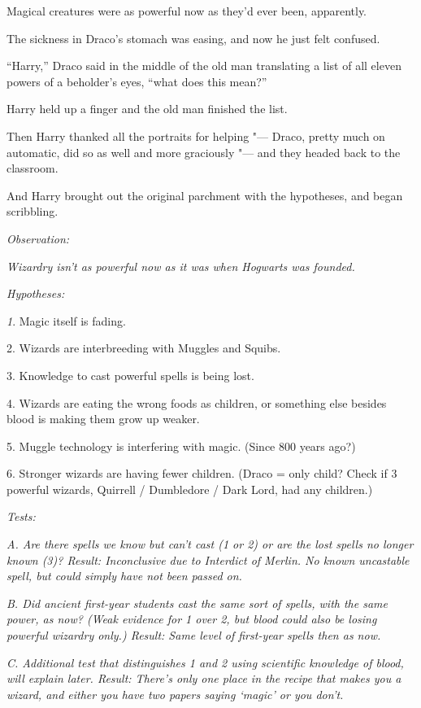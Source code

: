 Magical creatures were as powerful now as they'd ever been, apparently.

The sickness in Draco's stomach was easing, and now he just felt
confused.

``Harry,'' Draco said in the middle of the old man translating a list of
all eleven powers of a beholder's eyes, ``what does this mean?''

Harry held up a finger and the old man finished the list.

Then Harry thanked all the portraits for helping "--- Draco, pretty much on
automatic, did so as well and more graciously "--- and they headed back to
the classroom.

And Harry brought out the original parchment with the hypotheses, and
began scribbling.

\emph{Observation:}

\emph{Wizardry isn't as powerful now as it was when Hogwarts was
founded.}

\emph{Hypotheses:}

\emph{1}. Magic itself is fading.

2. Wizards are interbreeding with Muggles and Squibs.

3. Knowledge to cast powerful spells is being lost.

4. Wizards are eating the wrong foods as children, or something else
besides blood is making them grow up weaker.

5. Muggle technology is interfering with magic. (Since 800 years ago?)

6. Stronger wizards are having fewer children. (Draco = only child?
Check if 3 powerful wizards, Quirrell / Dumbledore / Dark Lord, had any
children.)

\emph{Tests:}

\emph{A. Are there spells we know but can't cast (1 or 2) or are the
lost spells no longer known (3)? Result: Inconclusive due to Interdict
of Merlin. No known uncastable spell, but could simply have not been
passed on.}

\emph{B. Did ancient first-year students cast the same sort of spells,
with the same power, as now? (Weak evidence for 1 over 2, but blood
could also be losing powerful wizardry only.) Result: Same level of
first-year spells then as now.}

\emph{C. Additional test that distinguishes 1 and 2 using scientific
knowledge of blood, will explain later. Result: There's only one place
in the recipe that makes you a wizard, and either you have two papers
saying `magic' or you don't.}

